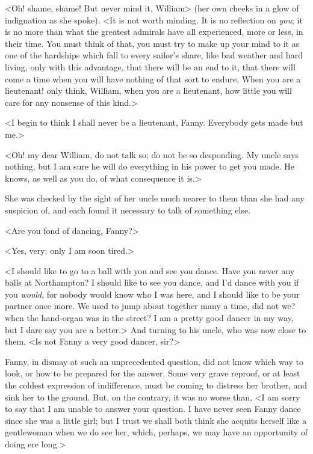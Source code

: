 <Oh! shame, shame! But never mind it, William> (her own cheeks in a glow of indignation as she spoke). <It is not worth minding. It is no reflection on \textit{you}; it is no more than what the greatest admirals have all experienced, more or less, in their time. You must think of that, you must try to make up your mind to it as one of the hardships which fall to every sailor's share, like bad weather and hard living, only with this advantage, that there will be an end to it, that there will come a time when you will have nothing of that sort to endure. When you are a lieutenant! only think, William, when you are a lieutenant, how little you will care for any nonsense of this kind.>

<I begin to think I shall never be a lieutenant, Fanny. Everybody gets made but me.>

<Oh! my dear William, do not talk so; do not be so desponding. My uncle says nothing, but I am sure he will do everything in his power to get you made. He knows, as well as you do, of what consequence it is.>

She was checked by the sight of her uncle much nearer to them than she had any suspicion of, and each found it necessary to talk of something else.

<Are you fond of dancing, Fanny?>

<Yes, very; only I am soon tired.>

<I should like to go to a ball with you and see you dance. Have you never any balls at Northampton? I should like to see you dance, and I'd dance with you if you \textit{would}, for nobody would know who I was here, and I should like to be your partner once more. We used to jump about together many a time, did not we? when the hand-organ was in the street? I am a pretty good dancer in my way, but I dare say you are a better.> And turning to his uncle, who was now close to them, <Is not Fanny a very good dancer, sir?>

Fanny, in dismay at such an unprecedented question, did not know which way to look, or how to be prepared for the answer. Some very grave reproof, or at least the coldest expression of indifference, must be coming to distress her brother, and sink her to the ground. But, on the contrary, it was no worse than, <I am sorry to say that I am unable to answer your question. I have never seen Fanny dance since she was a little girl; but I trust we shall both think she acquits herself like a gentlewoman when we do see her, which, perhaps, we may have an opportunity of doing ere long.>


